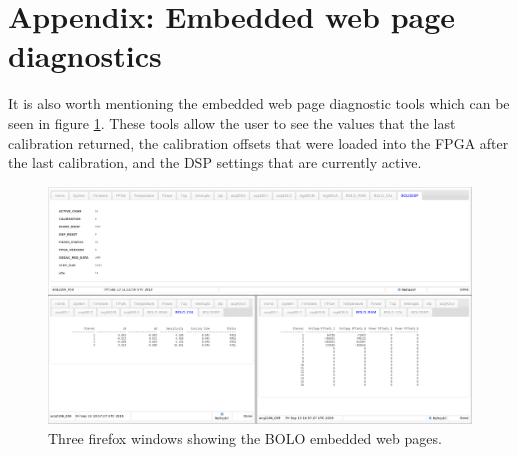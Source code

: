 \documentclass{article}
\begin{document}
\section{Appendix: Embedded web page diagnostics}
It is also worth mentioning the embedded web page diagnostic tools which can be seen in figure \ref{bolopages}.
These tools allow the user to see the values that the last calibration returned, the calibration offsets that were loaded into the FPGA after the last calibration, and the DSP settings that are currently active.

\begin{figure} [hbt!]
	\centering
	\includegraphics[width=5.0in]{images/bolo-pages.png}
	\caption{Three firefox windows showing the BOLO embedded web pages.}
	\label{bolopages}
\end{figure}
\end{document}
